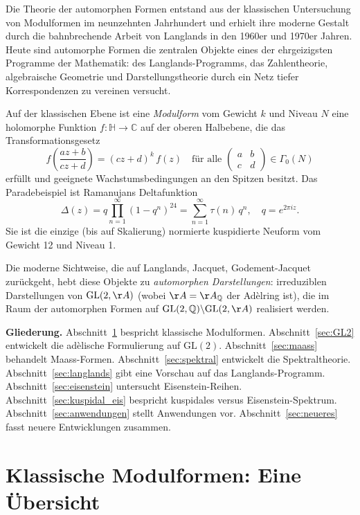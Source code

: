 \documentclass[12pt,a4paper]{amsart}
\theoremstyle{definition}
\newcommand{\HH}{\mathbb{H}}
\newcommand{\QQ}{\mathbb{Q}}
\newcommand{\CC}{\mathbb{C}}
\newcommand{\GL}{\mathrm{GL}}
\begin{document}
Die Theorie der automorphen Formen entstand aus der klassischen Untersuchung von
Modulformen im neunzehnten Jahrhundert und erhielt ihre moderne Gestalt durch die
bahnbrechende Arbeit von Langlands in den 1960er und 1970er Jahren. Heute sind
automorphe Formen die zentralen Objekte eines der ehrgeizigsten Programme der
Mathematik: des Langlands-Programms, das Zahlentheorie, algebraische Geometrie
und Darstellungstheorie durch ein Netz tiefer Korrespondenzen zu vereinen versucht.

Auf der klassischen Ebene ist eine \emph{Modulform} vom Gewicht $k$ und Niveau $N$
eine holomorphe Funktion $f: \HH \to \CC$ auf der oberen Halbebene, die das
Transformationsgesetz
\[
f\!\left(\frac{az+b}{cz+d}\right) = (cz+d)^k\, f(z)
\quad \text{für alle } \begin{pmatrix}a&b\\c&d\end{pmatrix} \in \Gamma_0(N)
\]
erfüllt und geeignete Wachstumsbedingungen an den Spitzen besitzt. Das Paradebeis\-piel
ist Ramanujans Deltafunktion
\[
\Delta(z) = q \prod_{n=1}^\infty (1-q^n)^{24} = \sum_{n=1}^\infty \tau(n)\, q^n,
\quad q = e^{2\pi i z}.
\]
Sie ist die einzige (bis auf Skalierung) normierte kuspidierte Neuform vom Gewicht 12
und Niveau 1.

Die moderne Sichtweise, die auf Langlands, Jacquet, Godement-Jacquet zurückgeht,
hebt diese Objekte zu \emph{automorphen Darstellungen}: irreduziblen Darstellungen
von $\GL(2,\AA)$ (wobei $\AA = \AA_\QQ$ der Adèlring ist), die im Raum der
automorphen Formen auf $\GL(2,\QQ) \backslash \GL(2,\AA)$ realisiert werden.

\medskip
\noindent\textbf{Gliederung.}
Abschnitt~\ref{sec:klassisch} bespricht klassische Modulformen.
Abschnitt~\ref{sec:GL2} entwickelt die adèlische Formulierung auf $\GL(2)$.
Abschnitt~\ref{sec:maass} behandelt Maass-Formen.
Abschnitt~\ref{sec:spektral} entwickelt die Spektraltheorie.
Abschnitt~\ref{sec:langlands} gibt eine Vorschau auf das Langlands-Programm.
Abschnitt~\ref{sec:eisenstein} untersucht Eisenstein-Reihen.
Abschnitt~\ref{sec:kuspidal_eis} bespricht kuspidales versus Eisenstein-Spektrum.
Abschnitt~\ref{sec:anwendungen} stellt Anwendungen vor.
Abschnitt~\ref{sec:neueres} fasst neuere Entwicklungen zusammen.

\section{Klassische Modulformen: Eine Übersicht}
\label{sec:klassisch}
\end{document}
